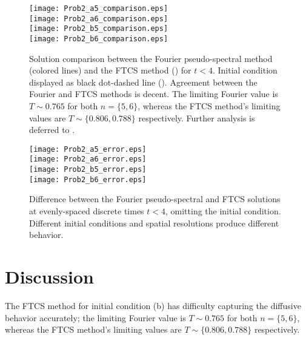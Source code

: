 \documentclass[11pt]{article}
\begin{document}
\begin{figure}[p!]
\begin{center}
\texttt{[image: Prob2\_a5\_comparison.eps]} \\
\texttt{[image: Prob2\_a6\_comparison.eps]} \\
\texttt{[image: Prob2\_b5\_comparison.eps]} \\
\texttt{[image: Prob2\_b6\_comparison.eps]}
\\[0.5cm]
\caption{Solution comparison between the Fourier pseudo-spectral method (colored lines) and the FTCS method (\dashrule) for $t<4$. Initial condition displayed as black dot-dashed line (\dotdashrule). Agreement between the Fourier and FTCS methods is decent. The limiting Fourier value is $T \sim 0.765$ for both $n=\{5,6\}$, whereas the FTCS method's limiting values are $T \sim \{0.806, 0.788\}$ respectively. Further analysis is deferred to .}
\label{fig:Prob2_comparison}
\end{center}
\end{figure}

\begin{figure}[p!]
\begin{center}
\texttt{[image: Prob2\_a5\_error.eps]} \\
\texttt{[image: Prob2\_a6\_error.eps]} \\
\texttt{[image: Prob2\_b5\_error.eps]} \\
\texttt{[image: Prob2\_b6\_error.eps]}
\\[0.5cm]
\caption{Difference between the Fourier pseudo-spectral and FTCS solutions at evenly-spaced discrete times $t<4$, omitting the initial condition. Different initial conditions and spatial resolutions produce different behavior.}
\label{fig:Prob2_error}
\end{center}
\end{figure}

\section{Discussion} %

The FTCS method for initial condition (b) has difficulty capturing the diffusive behavior accurately; the limiting Fourier value is $T \sim 0.765$ for both $n=\{5,6\}$, whereas the FTCS method's limiting values are $T \sim \{0.806, 0.788\}$ respectively.
\end{document}

